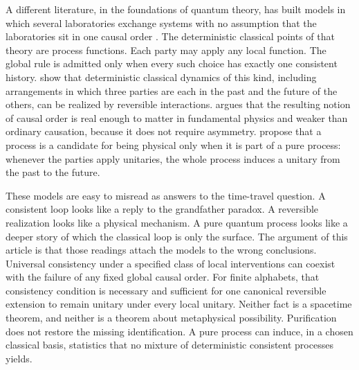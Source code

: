 \documentclass[11pt]{article}
\begin{document}
A different literature, in the foundations of quantum theory, has built models in which several laboratories exchange systems with no assumption that the laboratories sit in one causal order \citep{oreshkov2012,baumeler2016}. The deterministic classical points of that theory are process functions. Each party may apply any local function. The global rule is admitted only when every such choice has exactly one consistent history. \citet{baumeler2019} show that deterministic classical dynamics of this kind, including arrangements in which three parties are each in the past and the future of the others, can be realized by reversible interactions. \citet{adlam2023} argues that the resulting notion of causal order is real enough to matter in fundamental physics and weaker than ordinary causation, because it does not require asymmetry. \citet{araujo2017} propose that a process is a candidate for being physical only when it is part of a pure process: whenever the parties apply unitaries, the whole process induces a unitary from the past to the future.

These models are easy to misread as answers to the time-travel question. A consistent loop looks like a reply to the grandfather paradox. A reversible realization looks like a physical mechanism. A pure quantum process looks like a deeper story of which the classical loop is only the surface. The argument of this article is that those readings attach the models to the wrong conclusions. Universal consistency under a specified class of local interventions can coexist with the failure of any fixed global causal order. For finite alphabets, that consistency condition is necessary and sufficient for one canonical reversible extension to remain unitary under every local unitary. Neither fact is a spacetime theorem, and neither is a theorem about metaphysical possibility. Purification does not restore the missing identification. A pure process can induce, in a chosen classical basis, statistics that no mixture of deterministic consistent processes yields.
\end{document}
